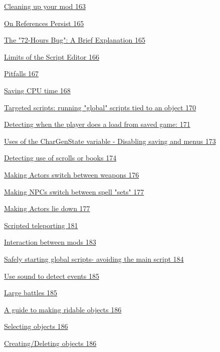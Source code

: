 \documentclass[
]{article}
\begin{document}
\protect\hyperlink{cleaning-up-your-mod}{Cleaning up your mod 163}

\protect\hyperlink{on-references-persist}{On References Persist 165}

\protect\hyperlink{the-72-hours-bug-a-brief-explanation}{The "72-Hours
Bug": A Brief Explanation 165}

\protect\hyperlink{limits-of-the-script-editor}{Limits of the Script
Editor 166}

\protect\hyperlink{pitfalls}{Pitfalls 167}

\protect\hyperlink{saving-cpu-time}{Saving CPU time 168}

\protect\hyperlink{targeted-scripts-running-global-scripts-tied-to-an-object}{Targeted
scripts: running "global" scripts tied to an object 170}

\protect\hyperlink{detecting-when-the-player-does-a-load-from-saved-game}{Detecting
when the player does a load from saved game: 171}

\protect\hyperlink{uses-of-the-chargenstate-variable---disabling-saving-and-menus}{Uses
of the CharGenState variable - Disabling saving and menus 173}

\protect\hyperlink{detecting-use-of-scrolls-or-books}{Detecting use of
scrolls or books 174}

\protect\hyperlink{making-actors-switch-between-weapons}{Making Actors
switch between weapons 176}

\protect\hyperlink{_Toc182634679}{Making NPCs switch between spell
"sets" 177}

\protect\hyperlink{making-actors-lie-down}{Making Actors lie down 177}

\protect\hyperlink{scripted-teleporting}{Scripted teleporting 181}

\protect\hyperlink{interaction-between-mods}{Interaction between mods
183}

\protect\hyperlink{safely-starting-global-scripts--avoiding-the-main-script}{Safely
starting global scripts- avoiding the main script 184}

\protect\hyperlink{use-sound-to-detect-events}{Use sound to detect
events 185}

\protect\hyperlink{large-battles}{Large battles 185}

\protect\hyperlink{a-guide-to-making-ridable-objects}{A guide to making
ridable objects 186}

\protect\hyperlink{selecting-objects}{Selecting objects 186}

\protect\hyperlink{creatingdeleting-objects}{Creating/Deleting objects
186}
\end{document}

